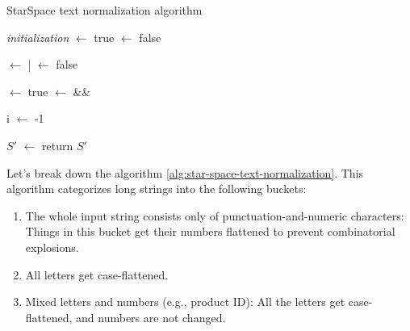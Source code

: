 \begin{algorithm}[H]
    \caption{StarSpace text normalization algorithm}
    \label{alg:star-space-text-normalization}



    \SetAlgoLined

    \BlankLine\emph{initialization}\;
    \allNumeric $\leftarrow$ true\;
    \containsDigits $\leftarrow$ false\;

    \BlankLine

    {
        \containsDigits $\leftarrow$ \containsDigits | \;
        \allNumeric $\leftarrow$ false\;
    }

    \BlankLine

    \flattenCase $\leftarrow$ true\;
    \flattenNum $\leftarrow$ \allNumeric \&\& \containsDigits\;

    \BlankLine

    i $\leftarrow$ -1 \;


    $S\prime$ $\leftarrow$ \normalizedText\;
    return $S\prime$ \;
    \BlankLine
    \BlankLine
\end{algorithm}


Let's break down the algorithm \ref{alg:star-space-text-normalization}. This algorithm categorizes long strings into the following buckets:

\begin{enumerate}
    \item The whole input string consists only of punctuation-and-numeric characters: Things in this bucket get their numbers flattened to prevent combinatorial explosions.
    \item All letters get case-flattened.
    \item Mixed letters and numbers (e.g., product ID): All the letters get case-flattened, and numbers are not changed.
\end{enumerate}

